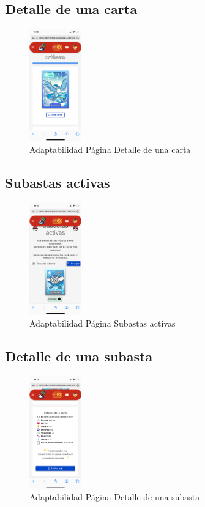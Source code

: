 \subsection*{Detalle de una carta}
\begin{figure}[H]
    \centering
    \includegraphics[width=0.2\textwidth]{figures/adaptabilidad/detalle_carta.png}
    \caption{Adaptabilidad Página Detalle de una carta}
    \label{fig:Adap-Carta}  
\end{figure}

\subsection*{Subastas activas}
\begin{figure}[H]
    \centering
    \includegraphics[width=0.2\textwidth]{figures/adaptabilidad/subastas.png}
    \caption{Adaptabilidad Página Subastas activas}
    \label{fig:Adap-Subastas}
\end{figure}


\subsection*{Detalle de una subasta}
\begin{figure}[H]
    \centering
    \includegraphics[width=0.2\textwidth]{figures/adaptabilidad/detalle_subasta.png}
    \caption{Adaptabilidad Página Detalle de una subasta}
    \label{fig:Adap-Detalle-Subasta}
\end{figure}

